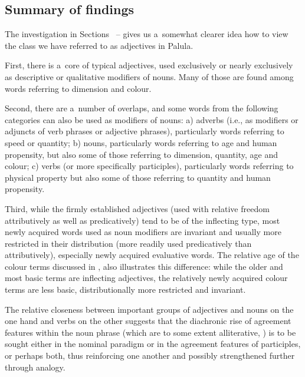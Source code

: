 \subsection{Summary of findings}
\label{subsec:6-2-9}

The investigation in Sections ~-- gives us a~somewhat clearer idea how to view the class we have referred to as adjectives in Palula. 



First, there is a~core of typical adjectives, used exclusively or nearly exclusively as descriptive or qualitative modifiers of nouns. Many of those are found among words referring to dimension and colour. 



Second, there are a~number of overlaps, and some words from the following categories can also be used as modifiers of nouns: a) adverbs (i.e., as modifiers or adjuncts of verb phrases or adjective phrases), particularly words referring to speed or quantity; b) nouns, particularly words referring to age and human propensity, but also some of those referring to dimension, quantity, age and colour; c) verbs (or more specifically participles), particularly words referring to physical property but also some of those referring to quantity and human propensity.



Third, while the firmly established adjectives (used with relative freedom attributively as well as predicatively) tend to be of the inflecting type, most newly acquired words used as noun modifiers are invariant and usually more restricted in their distribution (more readily used predicatively than attributively), especially newly acquired evaluative words. The relative age of the colour terms discussed in , also illustrates this difference: while the older and most basic terms are inflecting adjectives, the relatively newly acquired colour terms are less basic, distributionally more restricted and invariant.



The relative closeness between important groups of adjectives and nouns on the one hand and verbs on the other suggests that the diachronic rise of agreement features within the noun phrase (which are to some extent alliterative, \citealt[87]{corbett2006}) is to be sought either in the nominal paradigm or in the agreement features of participles, or perhaps both, thus reinforcing one another and possibly strengthened further through analogy.


